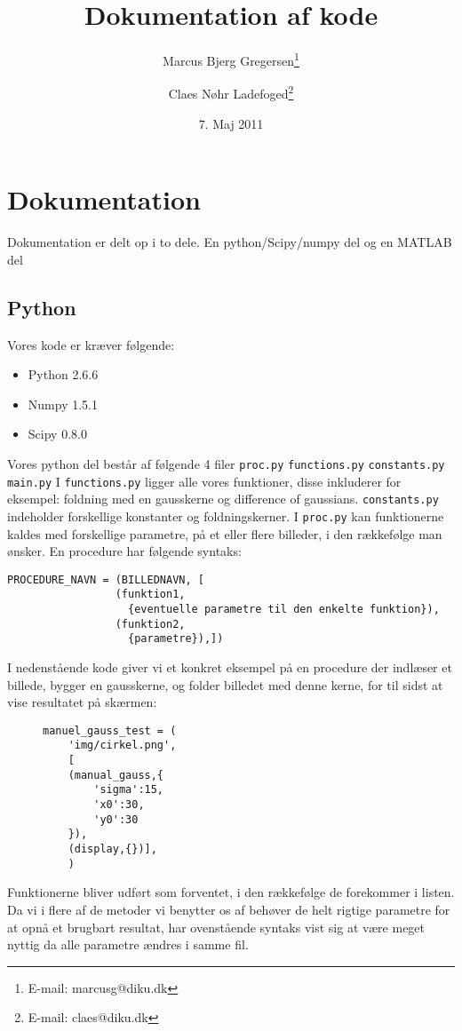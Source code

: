 \documentclass[a4paper,12pt]{article}
\begin{document}
\title{Dokumentation af kode}
\author{Marcus Bjerg Gregersen\thanks{E-mail: marcusg@diku.dk} 
\and Claes Nøhr Ladefoged\thanks{E-mail: claes@diku.dk} }
\date{7. Maj 2011}
\maketitle
\newpage
\section*{Dokumentation}
Dokumentation er delt op i to dele. En python/Scipy/numpy del og en MATLAB del
\subsection*{Python}
Vores kode er kræver følgende:
\begin{itemize}
	\item Python 2.6.6
    \item Numpy 1.5.1
	\item Scipy 0.8.0
\end{itemize}
Vores python del består af følgende 4 filer
\texttt{proc.py}
\texttt{functions.py}
\texttt{constants.py}
\texttt{main.py}
I \texttt{functions.py} ligger alle vores funktioner, disse inkluderer for eksempel: foldning med en gausskerne og difference of gaussians.
\texttt{constants.py} indeholder forskellige konstanter og foldningskerner. I \texttt{proc.py} kan funktionerne kaldes med forskellige parametre, på et eller flere billeder, i den rækkefølge man ønsker.
En procedure har følgende syntaks:
\begin{verbatim}
PROCEDURE_NAVN = (BILLEDNAVN, [
                 (funktion1,
                   {eventuelle parametre til den enkelte funktion}),
                 (funktion2,
                   {parametre}),])
\end{verbatim}
I nedenstående kode giver vi et konkret eksempel på en procedure der indlæser et billede, bygger en gausskerne, og folder billedet med denne kerne, for til sidst at vise resultatet på skærmen:
\begin{figure}[H]
\begin{verbatim}
manuel_gauss_test = ( 
    'img/cirkel.png',
    [
    (manual_gauss,{
        'sigma':15,
        'x0':30,
        'y0':30
    }),
    (display,{})],
    )
\end{verbatim}
\end{figure}
Funktionerne bliver udført som forventet, i den rækkefølge de forekommer i listen.
Da vi i flere af de metoder vi benytter os af behøver de helt rigtige parametre for at opnå et brugbart resultat, har ovenstående syntaks vist sig at være meget nyttig da alle parametre ændres i samme fil.
\end{document}
